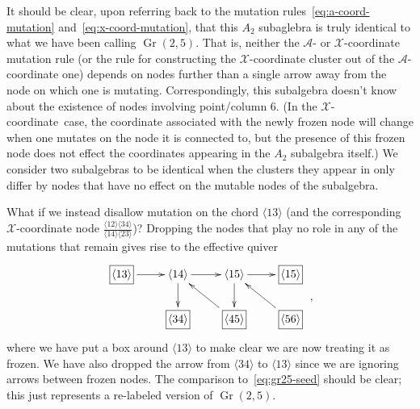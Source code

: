 \documentclass[12pt]{article}
\DeclareMathOperator{\Gr}{Gr}
\def\ket#1{\langle #1 \rangle}
\def\x{\mathcal{X}}
\def\xcoord{$\mathcal{X}$-coordinate}
\def\a{\mathcal{A}}
\begin{document}
It should be clear, upon referring back to the mutation rules~\eqref{eq:a-coord-mutation} and~\eqref{eq:x-coord-mutation}, that this $A_2$ subaglebra is truly identical to what we have been calling $\Gr(2,5)$. That is, neither the $\a$- or $\x$-coordinate mutation rule (or the rule for constructing the $\x$-coordinate cluster out of the $\a$-coordinate one) depends on nodes further than a single arrow away from the node on which one is mutating. Correspondingly, this subalgebra doesn't know about the existence of nodes involving point/column 6. (In the \xcoord\ case, the coordinate associated with the newly frozen node will change when one mutates on the node it is connected to, but the presence of this frozen node does not effect the coordinates appearing in the $A_2$ subalgebra itself.) We consider two subalgebras to be identical when the clusters they appear in only differ by nodes that have no effect on the mutable nodes of the subalgebra.  

What if we instead disallow mutation on the chord $\ket{13}$ (and the corresponding $\x$-coordinate node $\frac{\ket{12}\ket{34}}{\ket{14}\ket{23}}$)? Dropping the nodes that play no role in any of the mutations that remain gives rise to the effective quiver
\begin{equation}\label{eq:gr26-subalgebra-seed}
\begin{gathered}
\begin{xy} 0;<1pt,0pt>:<0pt,-1pt>::
	(25,0) *+{\langle 14\rangle} ="0",
	(75,0) *+{\langle 15\rangle} ="1",
	(125,0) *+{\framebox[5ex]{$\langle 15\rangle$}} ="2",
	(125,40) *+{\framebox[5ex]{$\langle 56\rangle$}} ="3",
	(75,40) *+{\framebox[5ex]{$\langle 45\rangle$}} ="4",
	(25,40) *+{\framebox[5ex]{$\langle 34\rangle$}} ="5",
	(-25,0) *+{\framebox[5ex]{$\langle 13\rangle$}} ="6",
	"0", {\ar"1"},
	"4", {\ar"0"},
	"0", {\ar"5"},
	"6", {\ar"0"},
	"1", {\ar"2"},
	"3", {\ar"1"},
	"1", {\ar"4"},
\end{xy}
\end{gathered} \ ,
\end{equation}
where we have put a box around $\ket{13}$ to make clear we are now treating it as frozen. We have also dropped the arrow from $\ket{34}$ to $\ket{13}$ since we are ignoring arrows between frozen nodes. The comparison to~\eqref{eq:gr25-seed} should be clear; this just represents a re-labeled version of $\Gr(2,5)$. 
\end{document}
